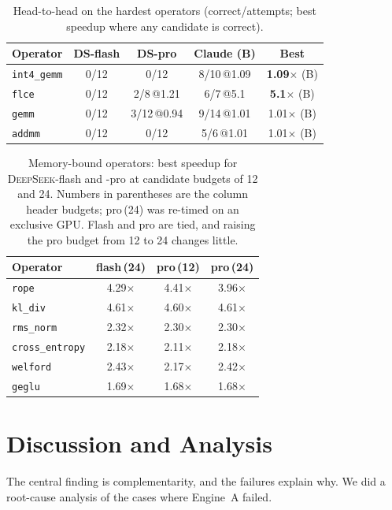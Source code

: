 \documentclass[conference]{IEEEtran}
\begin{document}
\begin{table}[t]
  \centering \footnotesize
  \caption{Head-to-head on the hardest operators (correct/attempts; best speedup
  where any candidate is correct).}
  \label{tab:h2h}
  \begin{tabular}{lcccc}
    \toprule
    Operator & DS-flash & DS-pro & Claude (B) & Best \\
    \midrule
    \texttt{int4\_gemm} & 0/12 & 0/12 & 8/10\,@1.09 & \textbf{1.09$\times$} (B) \\
    \texttt{flce}       & 0/12 & 2/8\,@1.21 & 6/7\,@5.1 & \textbf{5.1$\times$} (B) \\
    \texttt{gemm}       & 0/12 & 3/12\,@0.94 & 9/14\,@1.01 & 1.01$\times$ (B) \\
    \texttt{addmm}      & 0/12 & 0/12 & 5/6\,@1.01 & 1.01$\times$ (B) \\
    \bottomrule
  \end{tabular}
\end{table}

\begin{table}[t]
  \centering \footnotesize
  \caption{Memory-bound operators: best speedup for \textsc{DeepSeek}-flash and
  -pro at candidate budgets of 12 and 24. Numbers in parentheses are the column
  header budgets; pro$\,$(24) was re-timed on an exclusive GPU. Flash and pro are
  tied, and raising the pro budget from 12 to 24 changes little.}
  \label{tab:pro}
  \begin{tabular}{lccc}
    \toprule
    Operator & flash$\,$(24) & pro$\,$(12) & pro$\,$(24) \\
    \midrule
    \texttt{rope}          & 4.29$\times$ & 4.41$\times$ & 3.96$\times$ \\
    \texttt{kl\_div}       & 4.61$\times$ & 4.60$\times$ & 4.61$\times$ \\
    \texttt{rms\_norm}     & 2.32$\times$ & 2.30$\times$ & 2.30$\times$ \\
    \texttt{cross\_entropy}& 2.18$\times$ & 2.11$\times$ & 2.18$\times$ \\
    \texttt{welford}       & 2.43$\times$ & 2.17$\times$ & 2.42$\times$ \\
    \texttt{geglu}         & 1.69$\times$ & 1.68$\times$ & 1.68$\times$ \\
    \bottomrule
  \end{tabular}
\end{table}

\section{Discussion and Analysis}
The central finding is complementarity, and the failures explain why. We did a
root-cause analysis of the cases where Engine~A failed.
\end{document}
